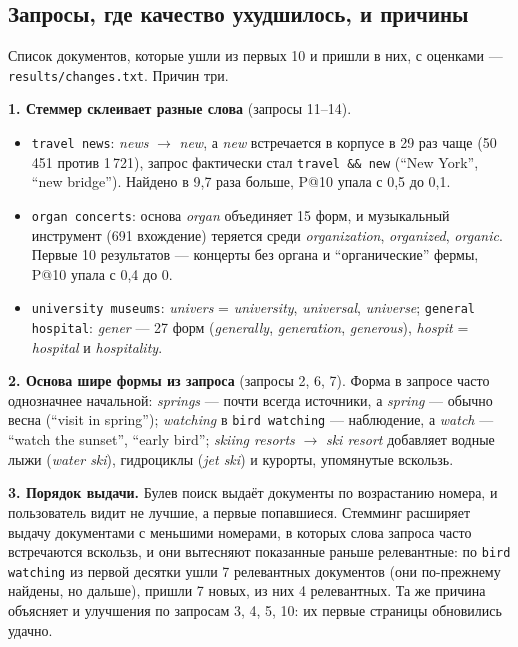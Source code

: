 \subsection{Запросы, где качество ухудшилось, и причины}
Список документов, которые ушли из первых 10 и пришли в них, с оценками --- \texttt{results/changes.txt}. Причин три.

\textbf{1. Стеммер склеивает разные слова} (запросы 11--14).
\begin{itemize}
    \item \texttt{travel news}: \emph{news} $\to$ \emph{new}, а \emph{new} встречается в корпусе в 29 раз чаще (50\,451 против 1\,721), запрос фактически стал \texttt{travel \&\& new} (\enquote{New York}, \enquote{new bridge}). Найдено в 9,7 раза больше, P@10 упала с 0,5 до 0,1.
    \item \texttt{organ concerts}: основа \emph{organ} объединяет 15 форм, и музыкальный инструмент (691 вхождение) теряется среди \emph{organization}, \emph{organized}, \emph{organic}. Первые 10 результатов --- концерты без органа и \enquote{органические} фермы, P@10 упала с 0,4 до 0.
    \item \texttt{university museums}: \emph{univers} = \emph{university}, \emph{universal}, \emph{universe}; \texttt{general hospital}: \emph{gener} --- 27 форм (\emph{generally}, \emph{generation}, \emph{generous}), \emph{hospit} = \emph{hospital} и \emph{hospitality}.
\end{itemize}

\textbf{2. Основа шире формы из запроса} (запросы 2, 6, 7). Форма в запросе часто однозначнее начальной: \emph{springs} --- почти всегда источники, а \emph{spring} --- обычно весна (\enquote{visit in spring}); \emph{watching} в \texttt{bird watching} --- наблюдение, а \emph{watch} --- \enquote{watch the sunset}, \enquote{early bird}; \emph{skiing resorts} $\to$ \emph{ski resort} добавляет водные лыжи (\emph{water ski}), гидроциклы (\emph{jet ski}) и курорты, упомянутые вскользь.

\textbf{3. Порядок выдачи.} Булев поиск выдаёт документы по возрастанию номера, и пользователь видит не лучшие, а первые попавшиеся. Стемминг расширяет выдачу документами с меньшими номерами, в которых слова запроса часто встречаются вскользь, и они вытесняют показанные раньше релевантные: по \texttt{bird watching} из первой десятки ушли 7 релевантных документов (они по-прежнему найдены, но дальше), пришли 7 новых, из них 4 релевантных. Та же причина объясняет и улучшения по запросам 3, 4, 5, 10: их первые страницы обновились удачно.

